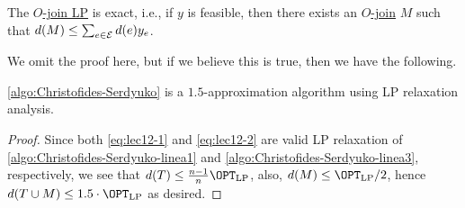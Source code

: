 \begin{remark}
	The \hyperref[eq:lec12-2]{\(O\)-join LP} is exact, i.e., if \(y\) is feasible, then there exists an \hyperref[def:O-join]{\(O\)-join} \(M\) such that \(d(M) \leq \sum_{e\in \mathcal{\MakeUppercase{e}} } d(e)y_e\).
\end{remark}
We omit the proof here, but if we believe this is true, then we have the following.

\begin{theorem}
	\autoref{algo:Christofides-Serdyuko} is a \(1.5\)-approximation algorithm using LP relaxation analysis.
\end{theorem}
\begin{proof}
	Since both \autoref{eq:lec12-1} and \autoref{eq:lec12-2} are valid LP relaxation of \autoref{algo:Christofides-Serdyuko-linea1} and \autoref{algo:Christofides-Serdyuko-linea3}, respectively, we see that \(d(T) \leq \frac{n-1}{n}\OPT_{\mathrm{LP}}\), also, \(d(M) \leq \OPT_{\mathrm{LP} } / 2\), hence \(d(T \cup M) \leq 1.5\cdot \OPT_{\mathrm{LP} }\) as desired.
\end{proof}